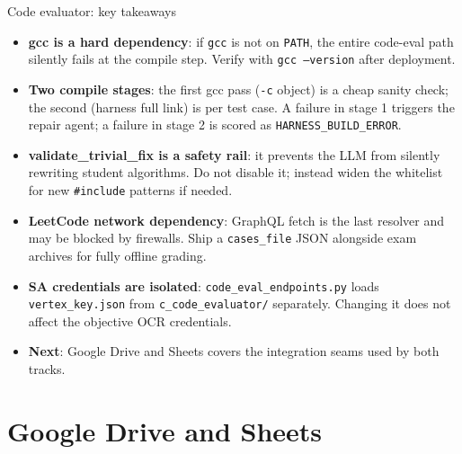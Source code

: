 \documentclass[aspectratio=169]{beamer}
\begin{document}
\begin{frame}{Code evaluator: key takeaways}
  \small
  \begin{itemize}\setlength\itemsep{0.3em}
    \item \textbf{gcc is a hard dependency}: if \texttt{gcc} is not on \texttt{PATH}, the entire code-eval path silently fails at the compile step. Verify with \texttt{gcc --version} after deployment.
    \item \textbf{Two compile stages}: the first gcc pass (\texttt{-c} object) is a cheap sanity check; the second (harness full link) is per test case. A failure in stage 1 triggers the repair agent; a failure in stage 2 is scored as \texttt{HARNESS\_BUILD\_ERROR}.
    \item \textbf{validate\_trivial\_fix is a safety rail}: it prevents the LLM from silently rewriting student algorithms. Do not disable it; instead widen the whitelist for new \texttt{\#include} patterns if needed.
    \item \textbf{LeetCode network dependency}: GraphQL fetch is the last resolver and may be blocked by firewalls. Ship a \texttt{cases\_file} JSON alongside exam archives for fully offline grading.
    \item \textbf{SA credentials are isolated}: \texttt{code\_eval\_endpoints.py} loads \texttt{vertex\_key.json} from \texttt{c\_code\_evaluator/} separately. Changing it does not affect the objective OCR credentials.
    \item \textbf{Next}: Google Drive and Sheets covers the integration seams used by both tracks.
  \end{itemize}
\end{frame}

\section{Google Drive and Sheets}
\end{document}

